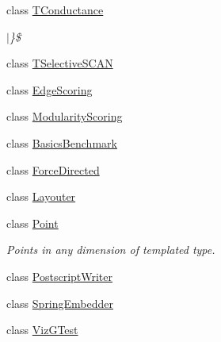 \begin{DoxyCompactItemize}
class \hyperlink{class_networ_kit_1_1_t_conductance}{T\-Conductance}
\begin{DoxyCompactList}\small\item\em $|$\}\$ \end{DoxyCompactList}\item 
class \hyperlink{class_networ_kit_1_1_t_selective_s_c_a_n}{T\-Selective\-S\-C\-A\-N}
\item 
class \hyperlink{class_networ_kit_1_1_edge_scoring}{Edge\-Scoring}
\item 
class \hyperlink{class_networ_kit_1_1_modularity_scoring}{Modularity\-Scoring}
\item 
class \hyperlink{class_networ_kit_1_1_basics_benchmark}{Basics\-Benchmark}
\item 
class \hyperlink{class_networ_kit_1_1_force_directed}{Force\-Directed}
\item 
class \hyperlink{class_networ_kit_1_1_layouter}{Layouter}
\item 
class \hyperlink{class_networ_kit_1_1_point}{Point}
\begin{DoxyCompactList}\small\item\em Points in any dimension of templated type. \end{DoxyCompactList}\item 
class \hyperlink{class_networ_kit_1_1_postscript_writer}{Postscript\-Writer}
\item 
class \hyperlink{class_networ_kit_1_1_spring_embedder}{Spring\-Embedder}
\item 
class \hyperlink{class_networ_kit_1_1_viz_g_test}{Viz\-G\-Test}
\end{DoxyCompactItemize}
